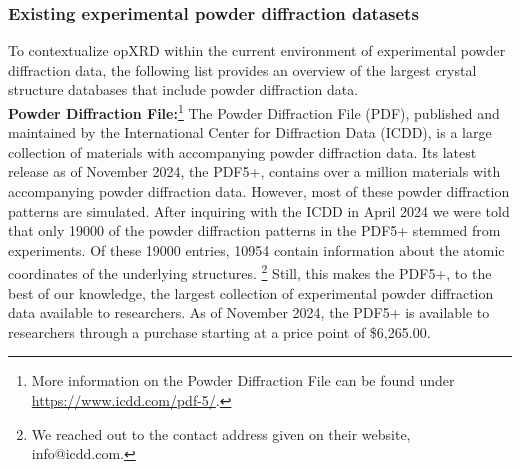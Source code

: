 

\pagebreak

\subsubsection*{Existing experimental powder diffraction datasets}
To contextualize opXRD within the current environment of experimental powder diffraction data, the following list provides an overview of the largest crystal structure databases that include powder diffraction data.  \\

\textbf{Powder Diffraction File:}\footnote{More information on the Powder Diffraction File can be found under \url{https://www.icdd.com/pdf-5/}.} The Powder Diffraction File (PDF), published and maintained by the International Center for Diffraction Data (ICDD), is a large collection of materials with accompanying powder diffraction data. Its latest release as of November 2024, the PDF5+, contains over a million materials with accompanying powder diffraction data. However, most of these powder diffraction patterns are simulated. After inquiring with the ICDD in April 2024 we were told that only 19000 of the powder diffraction patterns in the PDF5+ stemmed from experiments. Of these 19000 entries, 10954 contain information about the atomic coordinates of the underlying structures. \footnote{We reached out to the contact address given on their website, info@icdd.com.} Still, this makes the PDF5+, to the best of our knowledge, the largest collection of experimental powder diffraction data available to researchers. As of November 2024, the PDF5+ is available to researchers through a purchase starting at a price point of \$6,265.00.\\

